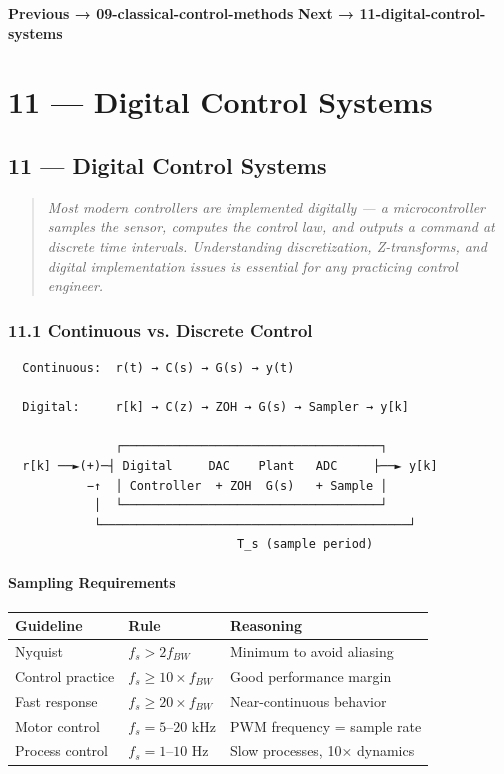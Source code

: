 \documentclass[11pt,a4paper]{book}
\begin{document}
\medskip\noindent\hrulefill\medskip

\textbf{Previous → 09-classical-control-methods}  
\textbf{Next → 11-digital-control-systems}


\chapter{11 — Digital Control Systems}
\section{11 — Digital Control Systems}

\begin{quote}
\textit{Most modern controllers are implemented digitally — a microcontroller samples the sensor, computes the control law, and outputs a command at discrete time intervals. Understanding discretization, Z-transforms, and digital implementation issues is essential for any practicing control engineer.}
\end{quote}

\medskip\noindent\hrulefill\medskip

\subsection{11.1 Continuous vs. Discrete Control}

\begin{lstlisting}
  Continuous:  r(t) → C(s) → G(s) → y(t)
  
  Digital:     r[k] → C(z) → ZOH → G(s) → Sampler → y[k]
  
               ┌────────────────────────────────────┐
  r[k] ──►(+)─┤ Digital     DAC    Plant   ADC     ├──► y[k]
           −↑  │ Controller  + ZOH  G(s)   + Sample │
            │  └────────────────────────────────────┘
            └───────────────────────────────────────────┘
                                T_s (sample period)
\end{lstlisting}

\subsubsection{Sampling Requirements}

\begin{center}
\begin{tabular}{|l|l|l|}
\hline
Guideline & Rule & Reasoning \\
\hline
Nyquist & $f_s > 2 f_{BW}$ & Minimum to avoid aliasing \\
Control practice & $f_s \geq 10 \times f_{BW}$ & Good performance margin \\
Fast response & $f_s \geq 20 \times f_{BW}$ & Near-continuous behavior \\
Motor control & $f_s = 5\text{–}20$ kHz & PWM frequency = sample rate \\
Process control & $f_s = 1\text{–}10$ Hz & Slow processes, 10× dynamics \\
\hline
\end{tabular}
\end{center}
\end{document}
